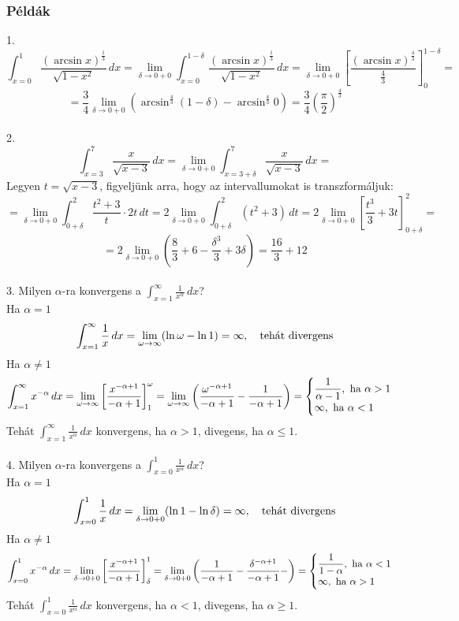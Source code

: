 \documentclass[a4paper,12pt,twoside]{book}
\theoremstyle{break}
\theoremstyle{plain}
\newcommand{\hatInteg}[3]{\ensuremath{\int^{#2}_{x=#1} #3\, dx}}
\begin{document}
\subsubsection{Példák}

1.
\[\hatInteg{0}{1}{\frac{(\arcsin x)^{\frac{1}{3}}}{\sqrt{1-x^2}}} = \lim_{\delta\to 0+0}\hatInteg{0}{1-\delta}{\frac{(\arcsin x)^{\frac{1}{3}}}{\sqrt{1-x^2}}} = \lim_{\delta\to 0+0}\left[\frac{(\arcsin x)^{\frac{4}{3}}}{\frac{4}{3}}\right]^{1-\delta}_{0} = \]
\[ = \frac{3}{4}\lim_{\delta\to 0+0}(\arcsin^\frac{4}{3} (1-\delta)-\arcsin^\frac{4}{3} 0) = \frac{3}{4}\left(\frac{\pi}{2}\right)^\frac{4}{3}\]\\

2.
\[\hatInteg{3}{7}{\frac{x}{\sqrt{x-3}}} = \lim_{\delta\to 0+0}\hatInteg{3+\delta}{7}{\frac{x}{\sqrt{x-3}}} = \]
Legyen $t=\sqrt{x-3}$, figyeljünk arra, hogy az intervallumokat is transzformáljuk:
\[= \lim_{\delta\to 0+0}\int^{2}_{0+\delta} \frac{t^2+3}{t}\cdot 2t\, dt = 2\lim_{\delta\to 0+0}\int^{2}_{0+\delta} (t^2+3)\, dt = 2\lim_{\delta\to 0+0}\left[\frac{t^3}{3}+3t\right]^{2}_{0+\delta} = \]
\[= 2\lim_{\delta\to 0+0}\left(\frac{8}{3}+6-\frac{\delta^3}{3}+3\delta\right) = \frac{16}{3}+12\]\\

3. Milyen $\alpha$-ra konvergens a $\displaystyle \hatInteg{1}{\infty}{\frac{1}{x^{\alpha}}}$?\\
Ha $\alpha = 1$
\[\hatInteg{1}{\infty}{\frac{1}{x}} = \lim_{\omega\to\infty} (\ln \omega - \ln 1) = \infty, \quad \hbox{tehát divergens}\]
Ha $\alpha \neq 1$
\[\hatInteg{1}{\infty}{x^{-\alpha}} = \lim_{\omega\to\infty} \left[\frac{x^{-\alpha+1}}{-\alpha+1}\right]^\omega_{1} = \lim_{\omega\to\infty} \left(\frac{\omega^{-\alpha+1}}{-\alpha+1}-\frac{1}{-\alpha+1}\right) = \begin{cases}\dfrac{1}{\alpha-1}, \hbox{ ha } \alpha > 1\\\infty, \hbox{ ha } \alpha < 1\end{cases}\]
Tehát $\displaystyle \hatInteg{1}{\infty}{\frac{1}{x^{\alpha}}}$ konvergens, ha $\alpha > 1$, divegens, ha $\alpha \leqslant 1$.\\\\

4. Milyen $\alpha$-ra konvergens a $\displaystyle \hatInteg{0}{1}{\frac{1}{x^{\alpha}}}$?\\
Ha $\alpha = 1$
\[\hatInteg{0}{1}{\frac{1}{x}} = \lim_{\delta\to 0+0} (\ln 1 - \ln \delta) = \infty, \quad \hbox{tehát divergens}\]
Ha $\alpha \neq 1$
\[\hatInteg{0}{1}{x^{-\alpha}} = \lim_{\delta\to 0+0} \left[\frac{x^{-\alpha+1}}{-\alpha+1}\right]^1_{\delta} = \lim_{\delta\to 0+0} \left(\frac{1}{-\alpha+1}-\frac{\delta^{-\alpha+1}}{-\alpha+1}-\right) = \begin{cases}\dfrac{1}{1-\alpha}, \hbox{ ha } \alpha < 1\\\infty, \hbox{ ha } \alpha > 1\end{cases}\]
Tehát $\displaystyle \hatInteg{0}{1}{\frac{1}{x^{\alpha}}}$ konvergens, ha $\alpha < 1$, divegens, ha $\alpha \geqslant 1$.\\\\
\end{document}
